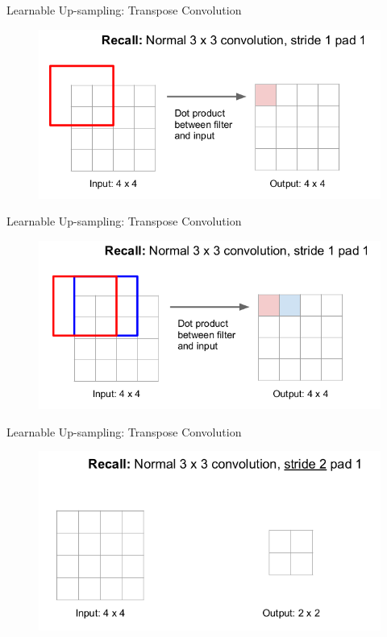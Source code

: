 \documentclass[aspectratio=169]{beamer}
\begin{document}
\begin{frame}{Learnable Up-sampling: Transpose Convolution}
\begin{figure}
    \centering
    \includegraphics[scale=.4]{demo/figs/tconv2.png}
\end{figure}
\end{frame}

\begin{frame}{Learnable Up-sampling: Transpose Convolution}
\begin{figure}
    \centering
    \includegraphics[scale=.4]{demo/figs/tconv3.png}
\end{figure}
\end{frame}

\begin{frame}{Learnable Up-sampling: Transpose Convolution}
\begin{figure}
    \centering
    \includegraphics[scale=.4]{demo/figs/tconv4.png}
\end{figure}
\end{frame}
\end{document}
